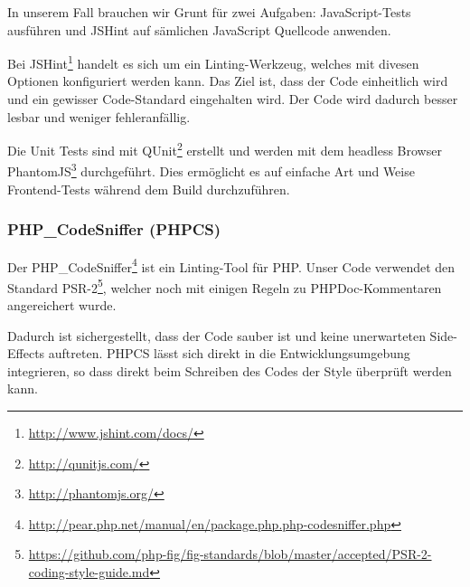 In unserem Fall brauchen wir Grunt für zwei Aufgaben: JavaScript-Tests ausführen und JSHint auf sämlichen JavaScript Quellcode anwenden.

Bei JSHint\footnote{\url{http://www.jshint.com/docs/}} handelt es sich um ein Linting-Werkzeug, welches mit divesen Optionen konfiguriert werden kann.
Das Ziel ist, dass der Code einheitlich wird und ein gewisser Code-Standard eingehalten wird.
Der Code wird dadurch besser lesbar und weniger fehleranfällig.

Die Unit Tests sind mit QUnit\footnote{\url{http://qunitjs.com/}} erstellt und werden mit dem headless Browser PhantomJS\footnote{\url{http://phantomjs.org/}} durchgeführt.
Dies ermöglicht es auf einfache Art und Weise Frontend-Tests während dem Build durchzuführen.

\subsubsection{PHP\_CodeSniffer (PHPCS)}
\label{phpcs}
Der PHP\_CodeSniffer\footnote{\url{http://pear.php.net/manual/en/package.php.php-codesniffer.php}} ist ein Linting-Tool für PHP.
Unser Code verwendet den Standard PSR-2\footnote{\url{https://github.com/php-fig/fig-standards/blob/master/accepted/PSR-2-coding-style-guide.md}}, welcher noch mit einigen Regeln zu PHPDoc-Kommentaren angereichert wurde.

Dadurch ist sichergestellt, dass der Code sauber ist und keine unerwarteten Side-Effects auftreten.
PHPCS lässt sich direkt in die Entwicklungsumgebung integrieren, so dass direkt beim Schreiben des Codes der Style überprüft werden kann.
